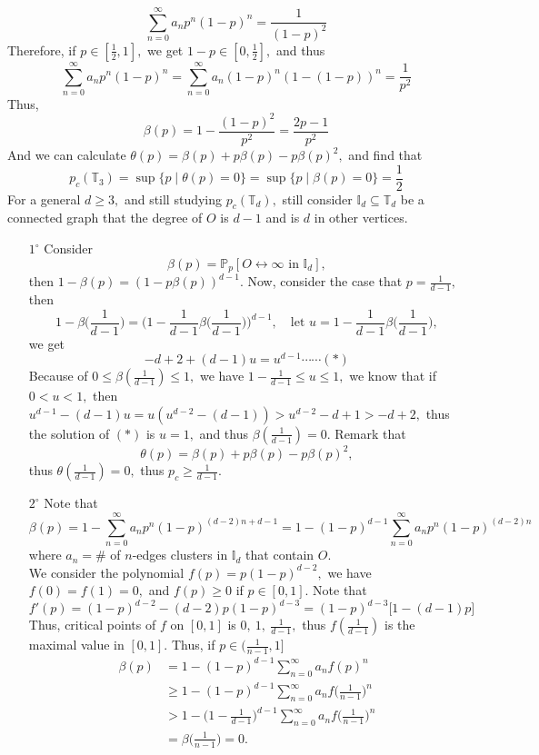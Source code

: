 \documentclass[12pt,a4paper]{report}
\theoremstyle{definition}
\begin{document}
\begin{flushleft}
\begin{enumerate}
	\[
	\sum_{n=0}^\infty a_np^n(1-p)^n=\frac{1}{(1-p)^2}
	\]
	Therefore, if $p\in [\frac{1}{2},1],$ we get $1-p\in[0,\frac{1}{2}],$ and thus
	\[
		\sum_{n=0}^\infty a_np^n(1-p)^n=\sum_{n=0}^\infty a_n(1-p)^n(1-(1-p))^n=\frac{1}{p^2}
	\]
	Thus,
	\[
	\beta(p)=1-\frac{(1-p)^2}{p^2}=\frac{2p-1}{p^2}
	\]
	And we can calculate $\theta(p)=\beta(p)+p\beta(p)-p\beta(p)^2,$ and find that
	\[
	p_c(\mathbb{T}_3)=\sup\{p\mid \theta(p)=0\}=\sup\{p\mid \beta(p)=0\}=\frac{1}{2}
	\]
	For a general $d\geq 3,$ and still studying $p_c(\mathbb{T}_d),$ still consider $\mathbb{I}_d\subseteq \mathbb{T}_d$ be a connected graph that the degree of $O$ is $d-1$ and is $d$ in other vertices. 
	\begin{enumerate}
	    \item[$1^\circ$] Consider 
	\[
	\beta(p)=\mathbb{P}_p[O\leftrightarrow\infty\mbox{ in }\mathbb{I}_d],
	\]
	then $1-\beta(p)=(1-p\beta(p))^{d-1}.$ Now, consider the case that $p=\frac{1}{d-1},$ then
	\[
	1-\beta\Big(\frac{1}{d-1}\Big)=\bigg(1-\frac{1}{d-1}\beta\Big(\frac{1}{d-1}\Big)\bigg)^{d-1},\quad \mbox{let }u=1-\frac{1}{d-1}\beta\Big(\frac{1}{d-1}\Big),
	\]
	we get 
	\[
	-d+2+(d-1)u=u^{d-1}\cdots\cdots (*)
	\]
	Because of $0\leq \beta(\frac{1}{d-1})\leq 1,$ we have $1-\frac{1}{d-1}\leq u\leq 1,$ we know that if $0<u<1,$ then $u^{d-1}-(d-1)u=u(u^{d-2}-(d-1))>u^{d-2}-d+1>-d+2,$ thus the solution of $(*)$ is $u=1,$ and thus $\beta(\frac{1}{d-1})=0.$ Remark that
	\[
	\theta(p)=\beta(p)+p\beta(p)-p\beta(p)^2,
	\]
	thus $\theta(\frac{1}{d-1})=0,$ thus $p_c\geq \frac{1}{d-1}.$
	\item[$2^\circ$] Note that
	\[
	\beta(p)=1-\sum_{n=0}^\infty a_np^n(1-p)^{(d-2)n+d-1}=1-(1-p)^{d-1}\sum_{n=0}^\infty a_np^n(1-p)^{(d-2)n}
	\]
	where $a_n=\#$ of $n$-edges clusters in $\mathbb{I}_d$ that contain $O.$\\
	We consider the polynomial $f(p)=p(1-p)^{d-2},$ we have $f(0)=f(1)=0,$ and $f(p)\geq 0$ if $p\in [0,1].$ Note that
	\[
	f'(p)=(1-p)^{d-2}-(d-2)p(1-p)^{d-3}=(1-p)^{d-3}\big[1-(d-1)p\big]
	\]
	Thus, critical points of $f$ on $[0,1]$ is $0,\ 1, \ \frac{1}{d-1},$ thus $f(\frac{1}{d-1})$ is the maximal value in $[0,1].$ Thus, if $p\in(\frac{1}{n-1},1]$
	\begin{align*}
	\beta(p)&=1-(1-p)^{d-1}\sum_{n=0}^\infty a_nf(p)^n\\
	&\geq 1-(1-p)^{d-1}\sum_{n=0}^\infty a_nf\big(\frac{1}{n-1}\big)^n \\
	&> 1-\big(1-\frac{1}{d-1}\big)^{d-1}\sum_{n=0}^\infty a_nf\big(\frac{1}{n-1}\big)^n\\
	&=\beta\big(\frac{1}{n-1}\big)=0.

\end{align*}
\end{enumerate}
\end{enumerate}
\end{flushleft}
\end{document}
